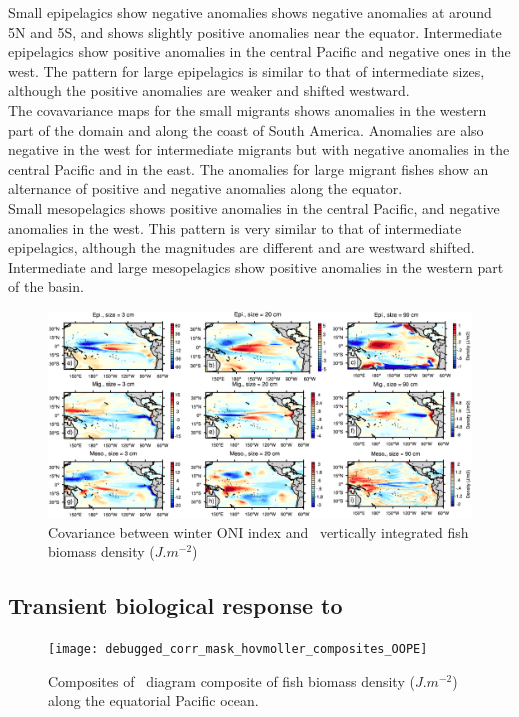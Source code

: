 Small epipelagics show negative anomalies shows negative anomalies at around 5N and 5S, and shows slightly positive anomalies 
near the equator. Intermediate epipelagics show positive anomalies in the central Pacific and negative ones in the west.
The pattern for large epipelagics is similar to that of intermediate sizes, although the positive anomalies are weaker and shifted westward.\\

The covavariance maps for the small migrants shows anomalies in the western part of the domain and along the coast of South America. Anomalies are also negative in the west for intermediate migrants but with negative anomalies in the central Pacific and in the east. The anomalies for large migrant fishes show an alternance of positive and negative anomalies along the equator. \\

Small mesopelagics shows positive anomalies in the central Pacific, and negative anomalies in the west.  
This pattern is very similar to that of intermediate epipelagics, although the magnitudes are different and are westward shifted. Intermediate and large mesopelagics show positive anomalies in the western part of the basin. \\ 

\begin{figure}[h!]
    \centering
    \includegraphics[width=\textwidth] {figs/debugged_corr_mask_covariance_maps_OOPE.pdf}
    \caption{Covariance between winter ONI index and \ap\ vertically integrated fish biomass density ($J.m^{-2}$)	}
    \label{fig:cov-ape}
\end{figure}

\subsection{Transient biological response to \nino}

\begin{figure}[h!]
    \centering
    \texttt{[image: debugged\_corr\_mask\_hovmoller\_composites\_OOPE]}
    \caption{Composites of \hov\ diagram composite of fish biomass density ($J.m^{-2}$) along the equatorial Pacific ocean.}
    \label{fig:hov-oope}
\end{figure}

\clearpage
